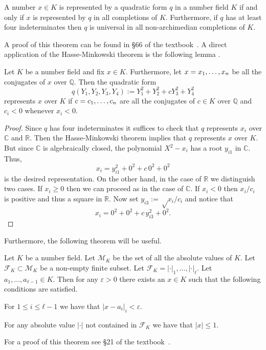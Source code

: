\begin{thm}\label{thm:Hasse Minkowski}
  A number \(x ∈ K\) is represented by a quadratic form \(q\) in a number field
  \(K\) if and only if \(x\) is represented by \(q\) in all completions of
  \(K\). Furthermore, if \(q\) has at least four indeterminates then \(q\) is
  universal in all non-archimedian completions of \(K\).
\end{thm}

A proof of this theorem can be found in §66 of the textbook~\cite{Meara2000}. A
direct application of the Hasse-Minkowski theorem is the following lemma
\cite[cf.][Lem.~5.1.1]{Shlapentokh2007}.

\begin{lem}\label{lem:quadratic form}
  Let \(K\) be a number field and fix \(x ∈ K\). Furthermore, let \(x =
  x_{1},\ldots,x_{n}\) be all the conjugates of \(x\) over \(ℚ\). Then the quadratic form
  \[
    q(Y_1, Y_2, Y_3, Y_4) := Y_1^2 + Y_2^2 + c Y_3^2 + Y_4^2
  \]
  represents \(x\) over \(K\) if \(c = c_{1},\ldots,c_{n}\) are all the conjugates of \(c ∈
  K\) over \(ℚ\) and \(c_i < 0\) whenever \(x_i < 0\).
\end{lem}
\begin{proof}
  Since \(q\) has four indeterminates it suffices to check that \(q\) represents
  \(x_i\) over \(ℂ\) and \(ℝ\). Then the Hasse-Minkowski theorem implies that
  \(q\) represents \(x\) over \(K\). But since \(ℂ\) is algebraically closed,
  the polynomial \(X^2 - x_i\) has a root \(y_{i1}\) in \(ℂ\). Thus,
  \[
    x_i = y_{i1}^2 + 0^2 + c\,0^2 + 0^2
  \]
  is the desired representation. On the other hand, in the case of \(ℝ\) we
  distinguish two cases. If \(x_i ≥ 0\) then we can proceed as in the case of
  \(ℂ\). If \(x_i < 0\) then \(x_i / c_i\) is positive and thus a square in
  \(ℝ\). Now set \(y_{i3} := √{x_i / c_i}\) and notice that
  \[
    x_i = 0^2 + 0^2 + c\,y_{i3}^2 + 0^2.
  \]
\end{proof}

Furthermore, the following theorem will be useful.

\begin{thm}\label{thm:strong approximation}
  Let \(K\) be a number field. Let \(\mathcal{M}_K\) be the set of all the
  absolute values of \(K\). Let \(\mathcal{F}_K ⊂ \mathcal{M}_K\) be a non-empty
  finite subset. Let \(\mathcal{F}_K = {|\cdot|_1,… ,|\cdot|_ℓ}\). Let
  \(a_1,…,a_{ℓ - 1} ∈ K\). Then for any \(ε > 0\) there exists an \(x ∈ K\) such
  that the following conditions are satisfied.
  \begin{thmlist}
    \item For \(1 ≤ i ≤ ℓ - 1\) we have that \(|x − a_i|_i <ε\).

    \item For any absolute value \(|\cdot|\) not contained in \(\mathcal{F}_K\)
    we have that \(|x| ≤ 1\).
  \end{thmlist}
\end{thm}
For a proof of this theorem see §21 of the textbook~\cite{Meara2000}.
